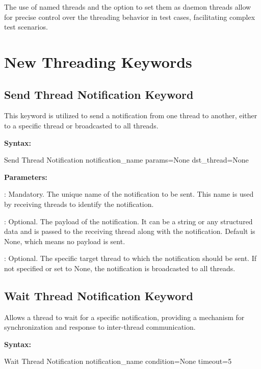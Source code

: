 The use of named threads and the option to set them as daemon threads allow for precise control over the threading behavior in test cases, facilitating complex test scenarios.

\section{New Threading Keywords}

\subsection{Send Thread Notification Keyword}

This keyword is utilized to send a notification from one thread to another, either to a specific thread or broadcasted to all threads.

\textbf{Syntax:}

\begin{robotcode}
Send Thread Notification    notification_name    params=None     dst_thread=None
\end{robotcode}

\textbf{Parameters:}

: Mandatory. The unique name of the notification to be sent. This name is used by receiving threads to identify the notification.

: Optional. The payload of the notification. It can be a string or any structured data and is passed to the receiving thread along with the notification. Default is None, which means no payload is sent.

: Optional. The specific target thread to which the notification should be sent. If not specified or set to None, the notification is broadcasted to all threads.

\subsection{Wait Thread Notification Keyword}

Allows a thread to wait for a specific notification, providing a mechanism for synchronization and response to inter-thread communication.

\textbf{Syntax:}

\begin{robotcode}
Wait Thread Notification     notification_name    condition=None     timeout=5
\end{robotcode}

